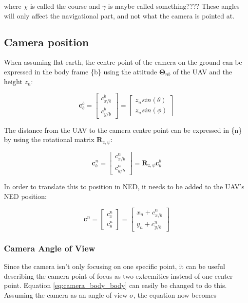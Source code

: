 \documentclass{article}
\begin{document}
where $\chi$ is called the course and $\gamma$ is maybe called something???? These angles will only affect the navigational part, and not what the camera is pointed at.

\subsection*{Camera position}
When assuming flat earth, the centre point of the camera on the ground can be expressed in the body frame \{b\} using the attitude $\bm{\Theta}_{nb}$ of the UAV and the height $z_n$:

\begin{equation} \label{eq:camera_body_body}
	\bm{c}_b^b = 
	\begin{bmatrix}
		c_{x/b}^b \\ c_{y/b}^b
	\end{bmatrix}
	=
	\begin{bmatrix}
		z_n sin(\theta) \\ z_n sin(\phi)
	\end{bmatrix}
\end{equation}

The distance from the UAV to the camera centre point can be expressed in \{n\} by using the rotational matrix $\bm{R}_{z,\psi}$:

\begin{equation} \label{eq:body_ned_rotate}
	\bm{c}^n_b = 
	\begin{bmatrix}
		c^n_{x/b} \\ c^n_{y/b}
	\end{bmatrix}
	= \bm{R}_{z, \psi}\bm{c}^b_b
\end{equation}

In order to translate this to position in NED, it needs to be added to the UAV's NED position:

\begin{equation} \label{eq:body_ned_trans}
	\bm{c}^n =
	\begin{bmatrix}
		c_x^n \\ c_y^n
	\end{bmatrix}
	=
	\begin{bmatrix}
		x_n + c^n_{x/b} \\
		y_n + c^n_{y/b}
	\end{bmatrix}
\end{equation}

\subsubsection*{Camera Angle of View}
Since the camera isn't only focusing on one specific point, it can be useful describing the camera point of focus as two extremities instead of one center point. Equation \eqref{eq:camera_body_body} can easily be changed to do this. Assuming the camera as an angle of view $\sigma$, the equation now becomes
\end{document}
